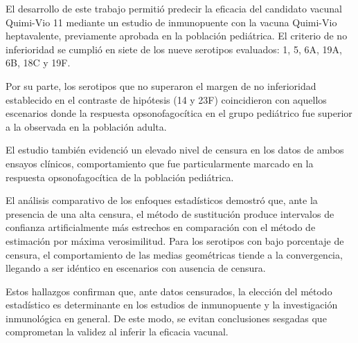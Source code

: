 \begin{conclusions}
    
    El desarrollo de este trabajo permitió predecir la eficacia del candidato vacunal Quimi-Vio 11 mediante un estudio de inmunopuente con la vacuna Quimi-Vio heptavalente, previamente aprobada en la población pediátrica. El criterio de no inferioridad se cumplió en siete de los nueve serotipos evaluados: 1, 5, 6A, 19A, 6B, 18C y 19F.
    
    Por su parte, los serotipos que no superaron el margen de no inferioridad establecido en el contraste de hipótesis (14 y 23F) coincidieron con aquellos escenarios donde la respuesta opsonofagocítica en el grupo pediátrico fue superior a la observada en la población adulta.
    
    El estudio también evidenció un elevado nivel de censura en los datos de ambos ensayos clínicos, comportamiento que fue particularmente marcado en la respuesta opsonofagocítica de la población pediátrica. 
    
    El análisis comparativo de los enfoques estadísticos demostró que, ante la presencia de una alta censura, el método de sustitución produce intervalos de confianza artificialmente más estrechos en comparación con el método de estimación por máxima verosimilitud. Para los serotipos con bajo porcentaje de censura, el comportamiento de las medias geométricas tiende a la convergencia, llegando a ser idéntico en escenarios con ausencia de censura.
    
    Estos hallazgos confirman que, ante datos censurados, la elección del método estadístico es determinante en los estudios de inmunopuente y la investigación inmunológica en general. De este modo, se evitan conclusiones sesgadas que comprometan la validez al inferir la eficacia vacunal.
\end{conclusions}
